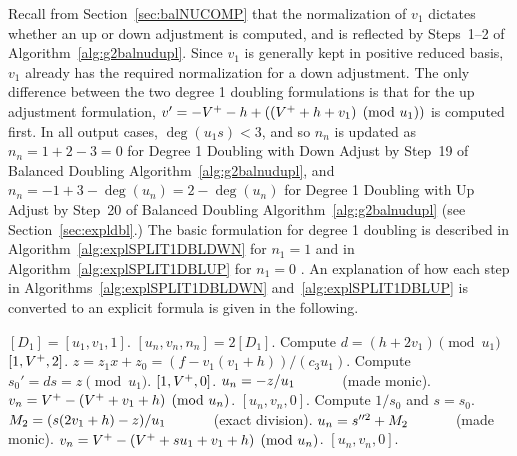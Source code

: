 Recall from Section~\ref{sec:balNUCOMP} that the normalization of $v_1$ dictates
whether an up or down adjustment is computed, and is reflected by Steps~1--2 of
Algorithm~\ref{alg:g2balnudupl}. Since $v_1$ is generally kept in positive
reduced basis, $v_1$ already has the required normalization for a down
adjustment. The only difference between the two degree 1 doubling formulations
is that for the up adjustment formulation, $v' = -V^{+} - h + ((V^{+} + h + v_1)
\pmod{u_1})$ is computed first. In all output cases, $\deg(u_1s) < 3$, and so
$n_n$ is updated as $n_n = 1 + 2 - 3 = 0$ for Degree 1 Doubling with Down Adjust
by Step~19 of Balanced Doubling Algorithm~\ref{alg:g2balnudupl}, and $n_n = -1 + 3 -
\deg(u_n) = 2 - \deg(u_n)$ for Degree 1 Doubling with Up Adjust by Step~20 of
Balanced Doubling Algorithm~\ref{alg:g2balnudupl} (see Section~\ref{sec:expldbl}.) The basic
formulation for degree 1 doubling is described in
Algorithm~\ref{alg:explSPLIT1DBLDWN} for $n_1 = 1$ and in
Algorithm~\ref{alg:explSPLIT1DBLUP} for $n_1 = 0$ . An explanation of how each
step in Algorithms~\ref{alg:explSPLIT1DBLDWN} and~\ref{alg:explSPLIT1DBLUP} is
converted to an explicit formula is given in the following.

\begin{algorithm}[htbp]
\caption{Genus 2 Split Model Degree 1 Doubling with Down Adjustment\label{alg:explSPLIT1DBLDWN}}
\begin{algorithmic} [1]
\Require $[D_1] = [u_1, v_1,1]$.  \smallskip
\Ensure $[u_n,v_n,n_n] = 2[D_1]$.
\algrule
\State Compute $d = (h + 2v_1) \pmod{u_1}$
 \Return $[1,V^{+},2]$.
\EndIf
\State $z = z_1x + z_0 = (f- v_1(v_1 + h))/(c_3u_1).$
\State Compute $s_0' = ds =  z \pmod{u_1}$.
     \Return $[1,V^{+},0]$.
    \EndIf
    \State $u_n = -z/u_1 \quad\quad\quad$ (made monic).
    \State $v_n = V^{+} - (V^{+} + v_1 + h) \pmod{u_n}$.
    \State \Return $[u_n,v_n,0]$.
\EndIf
\State Compute $1/s_0$ and $s = s_0$.
\State $M_2 = (s(2v_1 + h) - z)/u_1 \quad\quad\quad$ (exact division).
\State $u_n = s^{\prime \prime 2} + M_2 \quad\quad\quad$ (made monic).
\State $v_n = V^{+} - (V^{+} + su_1 + v_1 + h) \pmod{u_n}$.
\State \Return $[u_n,v_n,0]$.
\end{algorithmic}
\end{algorithm}


